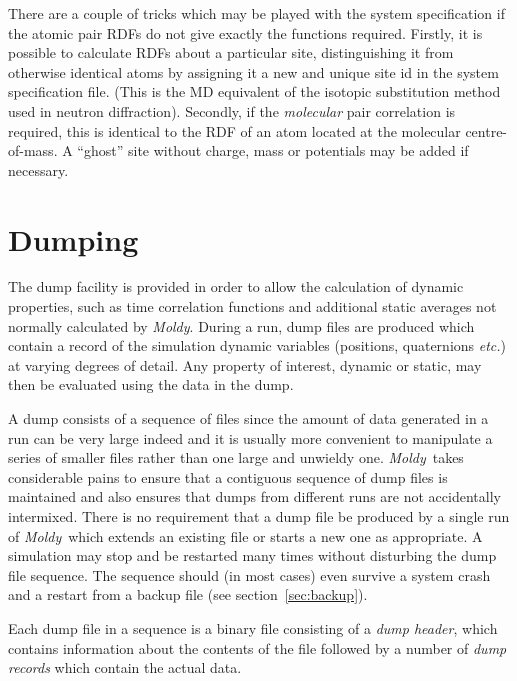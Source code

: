 \documentclass[a4paper,twoside]{report}
\newcommand{\moldy}{\emph{Moldy}}
\newcommand{\etc}{\emph{etc.}}
\begin{document}
There are a couple of tricks which may be played with the system
specification if the atomic pair RDFs do not give exactly the
functions required.  Firstly, it is possible to calculate RDFs about a
particular site, distinguishing it from otherwise identical atoms by
assigning it a new and unique site id in the system specification
file.  (This is the MD equivalent of the isotopic substitution method
used in neutron diffraction). Secondly, if the \emph{molecular} pair
correlation is required, this is identical to the RDF of an atom
located at the molecular centre-of-mass.  A ``ghost'' site without
charge, mass or potentials may be added if necessary.
\pagebreak[3]
\section{Dumping}%
\label{sec:dumping}
The dump facility is provided in order to allow the calculation of
dynamic properties, such as time correlation functions and additional
static averages not normally calculated by \moldy.  During a run, dump
files are produced which contain a record of the simulation dynamic
variables (positions, quaternions \etc) at varying degrees of
detail.  Any property of interest, dynamic or static, may then be
evaluated using the data in the dump.

A dump consists of a sequence of files since the amount of data
generated in a run can be very large indeed and it is usually more
convenient to manipulate a series of smaller files rather than one
large and unwieldy one. \moldy\  takes considerable pains to ensure that
a contiguous sequence of dump files is maintained and also ensures
that dumps from different runs are not accidentally intermixed.  There
is no requirement that a dump file be produced by a single run of
\moldy\, which extends an existing file or starts a new one as appropriate.
A simulation may stop and be restarted many times without
disturbing the dump file sequence.  The  sequence
should (in most cases) even survive a system crash and a restart from
a backup file (see section~\ref{sec:backup}).

Each dump file in a sequence is a binary file consisting of a
\emph{dump header}, which contains information about the contents of
the file followed by a number of \emph{dump records} which contain the
actual data.
\end{document}
